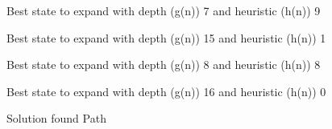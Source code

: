 \documentclass{article}
\begin{document}
{\noindent Best state to expand with depth (g(n)) 7 and heuristic (h(n)) 9\newline}
{}\newline

{\noindent Best state to expand with depth (g(n)) 15 and heuristic (h(n)) 1\newline}
{}\newline

{\noindent Best state to expand with depth (g(n)) 8 and heuristic (h(n)) 8\newline}
{}\newline

{\noindent Best state to expand with depth (g(n)) 16 and heuristic (h(n)) 0\newline}
{}\newline

{\noindent Solution found\newline}
Path\newline
{}\newline

{}\newline

{}\newline

{}\newline
\end{document}
